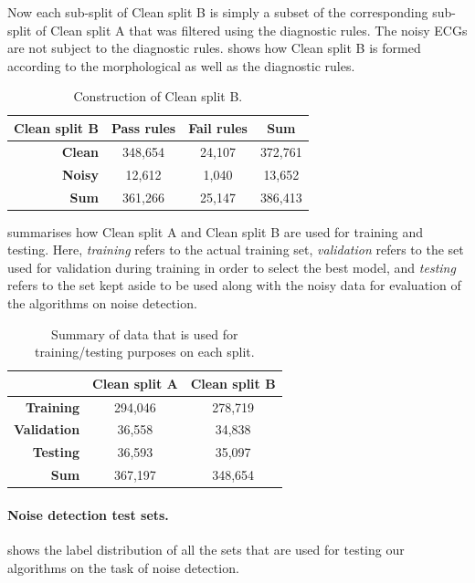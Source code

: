 \documentclass[a4paper,10pt]{article}
\begin{document}
Now each sub-split of Clean split B is simply a subset of the corresponding sub-split of Clean split A that was filtered using the diagnostic rules. The noisy ECGs are not subject to the diagnostic rules.  shows how Clean split B is formed according to the morphological as well as the diagnostic rules.
\begin{table}[htbp]
	\centering
	\begin{tabular}{r|c|c|c}
		\textbf{Clean split B} & \textbf{Pass rules} & \textbf{Fail rules} & \textbf{Sum} \\ \midrule
		\textbf{Clean}         & 348,654             & 24,107              & 372,761      \\
		\textbf{Noisy}         & 12,612              & 1,040               & 13,652       \\ \midrule
		\textbf{Sum}           & 361,266             & 25,147              & 386,413
	\end{tabular}
	\caption{Construction of Clean split B.}
	\label{tab:clean-split-b-dist}
\end{table}

 summarises how Clean split A and Clean split B are used for training and testing. Here, \emph{training} refers to the actual training set, \emph{validation} refers to the set used for validation during training in order to select the best model, and \emph{testing} refers to the set kept aside to be used along with the noisy data for evaluation of the algorithms on noise detection.

\begin{table}[htbp]
	\centering
	\begin{tabular}{r|c|c}
		                    & \textbf{Clean split A} & \textbf{Clean split B} \\ \midrule
		\textbf{Training}   & 294,046                & 278,719                \\
		\textbf{Validation} & 36,558                 & 34,838                 \\
		\textbf{Testing}    & 36,593                 & 35,097                 \\ \midrule
		\textbf{Sum}        & 367,197                & 348,654
	\end{tabular}
	\caption{Summary of data that is used for training/testing purposes on each split.}
	\label{tab:clean-train-val-test}
\end{table}

\paragraph{Noise detection test sets.}  shows the label distribution of all the sets that are used for testing our algorithms on the task of noise detection.
\end{document}
